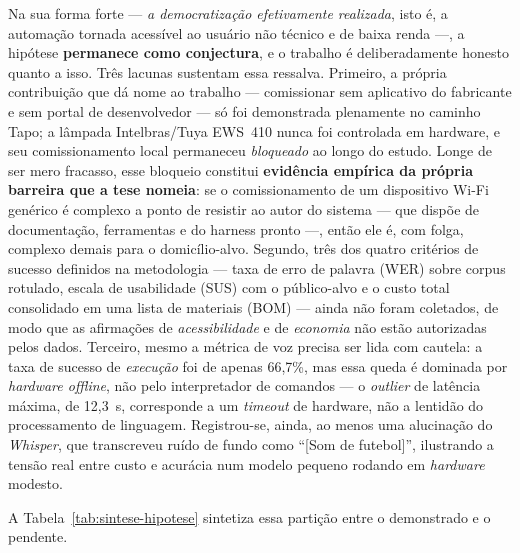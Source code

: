 Na sua forma forte --- \emph{a democratização efetivamente realizada}, isto é, a
automação tornada acessível ao usuário não técnico e de baixa renda ---, a hipótese
\textbf{permanece como conjectura}, e o trabalho é deliberadamente honesto quanto a
isso. Três lacunas sustentam essa ressalva. Primeiro, a própria contribuição que dá
nome ao trabalho --- comissionar sem aplicativo do fabricante e sem portal de
desenvolvedor --- só foi demonstrada plenamente no caminho Tapo; a lâmpada Intelbras/Tuya
EWS~410 nunca foi controlada em hardware, e seu comissionamento local permaneceu
\emph{bloqueado} ao longo do estudo. Longe de ser mero fracasso, esse bloqueio constitui
\textbf{evidência empírica da própria barreira que a tese nomeia}: se o comissionamento
de um dispositivo Wi-Fi genérico é complexo a ponto de resistir ao autor do sistema
--- que dispõe de documentação, ferramentas e do harness pronto ---, então ele é, com
folga, complexo demais para o domicílio-alvo. Segundo, três dos quatro critérios de
sucesso definidos na metodologia --- taxa de erro de palavra (WER) sobre corpus
rotulado, escala de usabilidade (SUS) com o público-alvo e o custo total consolidado em
uma lista de materiais (BOM) --- ainda não foram coletados, de modo que as afirmações de
\emph{acessibilidade} e de \emph{economia} não estão autorizadas pelos dados. Terceiro,
mesmo a métrica de voz precisa ser lida com cautela: a taxa de sucesso de
\emph{execução} foi de apenas 66,7\%, mas essa queda é dominada por \emph{hardware
offline}, não pelo interpretador de comandos --- o \textit{outlier} de latência máxima,
de 12,3~s, corresponde a um \textit{timeout} de hardware, não a lentidão do
processamento de linguagem. Registrou-se, ainda, ao menos uma alucinação do
\textit{Whisper}, que transcreveu ruído de fundo como ``[Som de futebol]'', ilustrando a
tensão real entre custo e acurácia num modelo pequeno rodando em \textit{hardware}
modesto.

A Tabela~\ref{tab:sintese-hipotese} sintetiza essa partição entre o demonstrado e o
pendente.

